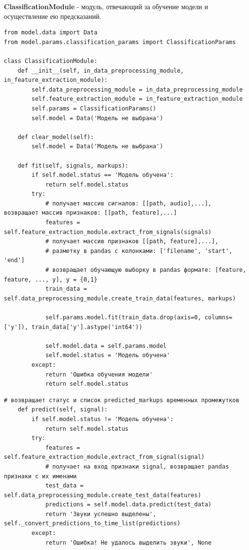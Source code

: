 \documentclass[utf8x, 14pt, oneside, a4paper]{article}
\begin{document}
	{\bf ClassificationModule} - модуль, отвечающий за обучение модели и осуществление ею предсказаний.
	\begin{lstlisting}[caption=ClassificationModule]
from model.data import Data
from model.params.classification_params import ClassificationParams

class ClassificationModule:
	def __init__(self, in_data_preprocessing_module, in_feature_extraction_module):
		self.data_preprocessing_module = in_data_preprocessing_module
		self.feature_extraction_module = in_feature_extraction_module
		self.params = ClassificationParams()
		self.model = Data('Модель не выбрана')
	
	def clear_model(self):
		self.model = Data('Модель не выбрана')
	
	def fit(self, signals, markups):
		if self.model.status == 'Модель обучена':
			return self.model.status
		try:
			# получает массив сигналов: [[path, audio],...], возвращает массив признаков: [[path, feature],...]
			features = self.feature_extraction_module.extract_from_signals(signals)
			# получает массив признаков [[path, feature],...],
			# разметку в pandas с колонками: ['filename', 'start', 'end']
			# возвращает обучающую выборку в pandas формате: [feature, feature, ..., y], y = {0,1}
			train_data = self.data_preprocessing_module.create_train_data(features, markups)
			
			self.params.model.fit(train_data.drop(axis=0, columns=['y']), train_data['y'].astype('int64'))
			
			self.model.data = self.params.model
			self.model.status = 'Модель обучена'
		except:
			return 'Ошибка обучения модели'
			return self.model.status
	\end{lstlisting}

	\newpage

	\begin{lstlisting}[caption=ClassificationModule Продолжение]
	# возвращает статус и список predicted_markups временных промежутков
	def predict(self, signal):
		if self.model.status != 'Модель обучена':
			return self.model.status
		try:
			features = self.feature_extraction_module.extract_from_signal(signal)
			# получает на вход признаки signal, возвращает pandas признаки с их именами
			test_data = self.data_preprocessing_module.create_test_data(features)
			predictions = self.model.data.predict(test_data)
			return 'Звуки успешно выделены', 	self._convert_predictions_to_time_list(predictions)
		except:
			return 'Ошибка! Не удалось выделить звуки', None
	\end{lstlisting}
	
\end{document}
